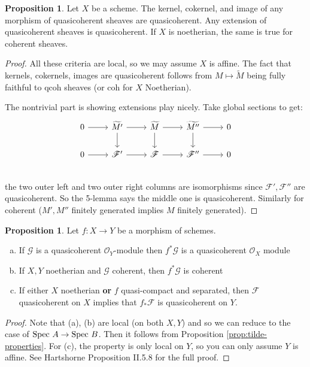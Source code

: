 \documentclass[10pt,reqno]{amsart}
\theoremstyle{definition}
\newtheorem{proposition}[theorem]{Proposition}
\theoremstyle{remark}
\numberwithin{equation}{section}
\numberwithin{theorem}{section}
\newcommand{\OO}{{\mathcal O}}
\newcommand{\spec}{\textup{Spec }}
\newcommand{\FF}{{\mathscr F}}
\newcommand{\GG}{{\mathscr G}}
\newcommand{\wt}{\widetilde}
\begin{document}
\begin{proposition} Let $X$ be a scheme. The kernel, cokernel, and image of any morphism of quasicoherent sheaves are quasicoherent. Any extension of quasicoherent sheaves is quasicoherent. If $X$ is noetherian, the same is true for coherent sheaves.
\end{proposition}
\begin{proof}
All these criteria are local, so we may assume $X$ is affine. The fact that kernels, cokernels, images are quasicoherent follows from $M \mapsto \wt{M}$ being fully faithful to qcoh sheaves (or coh for $X$ Noetherian).

The nontrivial part is showing extensions play nicely. Take global sections to get:
\[
\begin{tikzcd}
0 \arrow[r]& \wt{M'} \arrow[r] \arrow[d]& \wt{M} \arrow[r] \arrow[d]& \wt{M''} \arrow[r] \arrow[d]& 0\\
0 \arrow[r]& \FF' \arrow[r] & \FF \arrow[r]& \FF'' \arrow[r]& 0\\
\end{tikzcd}
\]
the two outer left and two outer right columns are isomorphisms since $\FF', \FF''$ are quasicoherent. So the 5-lemma says the middle one is quasicoherent. Similarly for coherent ($M',M''$ finitely generated implies $M$ finitely generated). 
\end{proof}

\begin{proposition} Let $f: X \to Y$ be a morphism of schemes.
\begin{enumerate}[(a)]
\item If $\GG$ is a quasicoherent $\OO_Y$-module then $f^* \GG$ is a quasicoherent $\OO_X$ module
\item If $X,Y$ noetherian and $\GG$ coherent, then $f^* \GG$ is coherent
\item If either $X$ noetherian \textbf{or} $f$ quasi-compact and separated, then $\FF$ quasicoherent on $X$ implies that  $f_* \FF$ is quasicoherent on $Y$.
\end{enumerate}
\begin{proof}
Note that (a), (b) are local (on both $X,Y$) and so we can reduce to the case of $\spec A \to \spec B$. Then it follows from Proposition \ref{prop:tilde-properties}. For (c), the property is only local on $Y$, so you can only assume $Y$ is affine. See Hartshorne Proposition II.5.8 for the full proof.
\end{proof}
\end{proposition}
\end{document}
